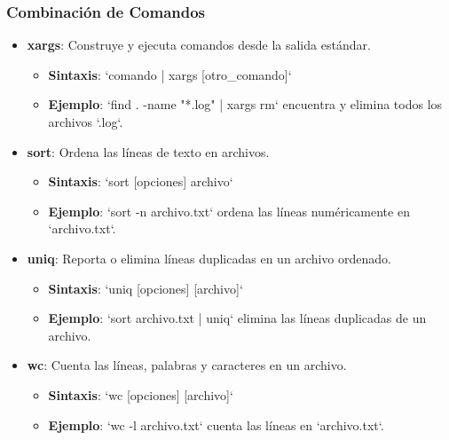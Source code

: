 \documentclass{beamer}
\begin{document}
\begin{frame}
\frametitle{Combinación de Comandos}
\begin{itemize}
    \item \textbf{xargs}: Construye y ejecuta comandos desde la salida estándar.
    \begin{itemize}
        \item \textbf{Sintaxis}: `comando | xargs [otro_comando]`
        \item \textbf{Ejemplo}: `find . -name "*.log" | xargs rm` encuentra y elimina todos los archivos `.log`.
    \end{itemize}
    \item \textbf{sort}: Ordena las líneas de texto en archivos.
    \begin{itemize}
        \item \textbf{Sintaxis}: `sort [opciones] archivo`
        \item \textbf{Ejemplo}: `sort -n archivo.txt` ordena las líneas numéricamente en `archivo.txt`.
    \end{itemize}
    \item \textbf{uniq}: Reporta o elimina líneas duplicadas en un archivo ordenado.
    \begin{itemize}
        \item \textbf{Sintaxis}: `uniq [opciones] [archivo]`
        \item \textbf{Ejemplo}: `sort archivo.txt | uniq` elimina las líneas duplicadas de un archivo.
    \end{itemize}
    \item \textbf{wc}: Cuenta las líneas, palabras y caracteres en un archivo.
    \begin{itemize}
        \item \textbf{Sintaxis}: `wc [opciones] [archivo]`
        \item \textbf{Ejemplo}: `wc -l archivo.txt` cuenta las líneas en `archivo.txt`.
    \end{itemize}
\end{itemize}
\end{frame}
\end{document}

